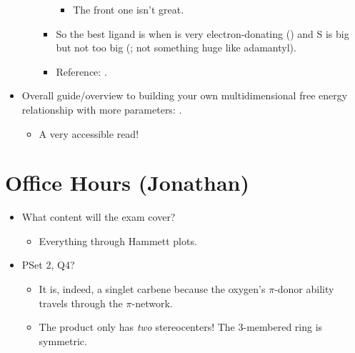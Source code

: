 \documentclass[../notes.tex]{subfiles}
\begin{document}
\begin{itemize}
\begin{itemize}
\begin{itemize}
\begin{itemize}
                \item The front one isn't great.
            \end{itemize}
            \item So the best ligand is when  is very electron-donating () and S is big but not too big (; not something huge like adamantyl).
            \item Reference: \textcite{bib:SigmanMulti}.
        \end{itemize}
    \end{itemize}
    \item Overall guide/overview to building your own multidimensional free energy relationship with more parameters: \textcite{bib:SigmanReview}.
    \begin{itemize}
        \item A very accessible read!
    \end{itemize}
\end{itemize}



\section{Office Hours (Jonathan)}
\begin{itemize}
    \item {}What content will the exam cover?
    \begin{itemize}
        \item Everything through Hammett plots.
    \end{itemize}
    \item PSet 2, Q4?
    \begin{itemize}
        \item It is, indeed, a singlet carbene because the oxygen's $\pi$-donor ability travels through the $\pi$-network.
        \item The product only has \emph{two} stereocenters! The 3-membered ring is symmetric.
    \end{itemize}
\end{itemize}
\end{document}
